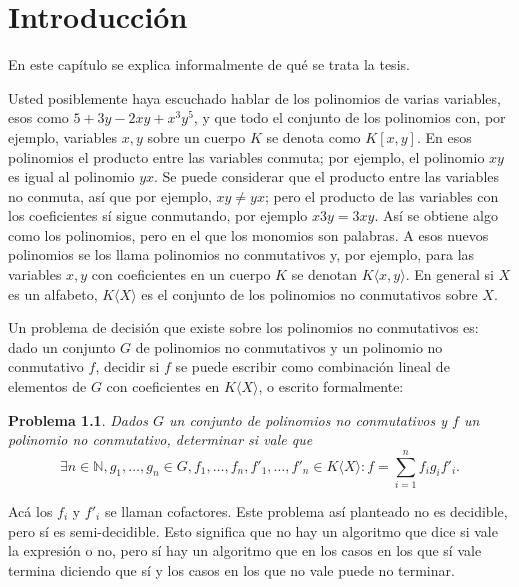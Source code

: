 \documentclass[12pt]{report}
\theoremstyle{customstyle}
\newtheorem{problem}{Problema}
\theoremstyle{factstyle}
\newcommand\cpp{C\nolinebreak[4]\hspace{-.05em}\raisebox{.4ex}{\relsize{-3}{\textbf{++}}}\xspace}
\begin{document}
\def\tituloTesis{Implementación de bases de Gröbner no conmutativas en \cpp con un poquito de paralelismo}



\tableofcontents

\chapter{Introducción}

En este capítulo se explica informalmente de qué se trata la tesis.

Usted posiblemente haya escuchado hablar de los polinomios de varias variables, esos como $5 + 3 y - 2 x y + x^3 y^5$, y que todo el conjunto de los polinomios con, por ejemplo, variables $x, y$ sobre un cuerpo $K$ se denota como $K[x, y]$. En esos polinomios el producto entre las variables conmuta; por ejemplo, el polinomio $x y$ es igual al polinomio $y x$. Se puede considerar que el producto entre las variables no conmuta, así que por ejemplo, $x y ≠ y x$; pero el producto de las variables con los coeficientes sí sigue conmutando, por ejemplo $x 3 y = 3 x y$. Así se obtiene algo como los polinomios, pero en el que los monomios son palabras. A esos nuevos polinomios se los llama polinomios no conmutativos y, por ejemplo, para las variables $x, y$ con coeficientes en un cuerpo $K$ se denotan $K⟨x, y⟩$. En general si $X$ es un alfabeto, $K⟨X⟩$ es el conjunto de los polinomios no conmutativos sobre $X$.

Un problema de decisión que existe sobre los polinomios no conmutativos es: dado un conjunto $G$ de polinomios no conmutativos y un polinomio no conmutativo $f$, decidir si $f$ se puede escribir como combinación lineal de elementos de $G$ con coeficientes en $K⟨X⟩$, o escrito formalmente:

\begin{problem}\label{problem:principal}
  Dados $G$ un conjunto de polinomios no conmutativos y $f$ un polinomio no conmutativo, determinar si vale que
  \[ ∃n ∈ ℕ, g_1, …, g_n ∈ G, f_1, …, f_n, f'_1, …, f'_n ∈ K⟨X⟩ : f = ∑_{i = 1}^n f_i g_i f'_i \text{.}\]
\end{problem}

Acá los $f_i$ y $f'_i$ se llaman cofactores. Este problema así planteado no es decidible, pero sí es semi-decidible. Esto significa que no hay un algoritmo que dice si vale la expresión o no, pero sí hay un algoritmo que en los casos en los que sí vale termina diciendo que sí y los casos en los que no vale puede no terminar.
\end{document}
